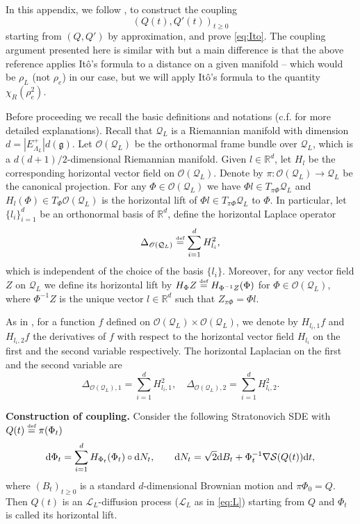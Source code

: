 \documentclass[11pt,UTF-8,reqno]{amsart}
\numberwithin{equation}{section}
\def\dif{{\mathord{{\rm d}}}}
\newcommand{\eqdef}{\stackrel{\mbox{\tiny def}}{=}}
\def\cL{{\mathcal L}}
\def\cQ{{\mathcal Q}}
\def\cS{{\mathcal S}}
\def\mR{{\mathbb R}}
\def\sO{{\mathscr O}}
\def\geq{\geqslant}
\def\ge{\geqslant}
\def\dif{{\mathord{{\rm d}}}}
\def\mfg{\mathfrak{g}}
\def\geq{\geqslant}
\def\ge{\geqslant}
\def\dg{d(\mfg)}
\begin{document}
In this appendix, we follow \cite{Ken86}, \cite[Section~2.1]{Wang}  to construct the coupling 
$$
(Q(t),Q'(t))_{t\geq0}
$$ 
starting from $(Q, Q')$ by approximation,
 and prove \eqref{eq:Ito}.
The coupling argument presented here is similar with  \cite[Chapter~2]{Wang} but a main difference is that  the above reference applies It\^o's formula to a distance on a given manifold -- which would be $\rho_L$ (not $\rho_e$) in our case, but we will
apply It\^o's formula to the quantity $\chi_R(\rho_e^2)$.


Before proceeding we recall the basic definitions and notations (c.f. \cite[Chapter~2]{Hsu} for more detailed explanations).
Recall that  $\cQ_L$ is a Riemannian manifold with dimension $d=|E^+_{\Lambda_L}|\dg$.
Let $\sO(\cQ_L)$ be the orthonormal frame bundle over $\cQ_L$, which is  a $d(d+1)/2$-dimensional Riemannian manifold.
Given $l\in \mR^d$, let $H_l$ be the corresponding horizontal vector field on $\sO(\cQ_L)$.
Denote by $\pi: \sO(\cQ_L) \rightarrow \cQ_L$ be the canonical projection.
For any $\Phi\in \sO(\cQ_L)$ we have $\Phi l\in T_{\pi \Phi}\cQ_L$ and $H_l(\Phi)\in T_{\Phi}\sO(\cQ_L)$ is the horizontal lift of $\Phi l\in T_{\pi \Phi}\cQ_L$ to $\Phi$.
In particular, let $\{l_i\}_{i=1}^d$ be an orthonormal basis of $\mR^d$, define the horizontal Laplace operator
$$\Delta_{\sO(\cQ_L)}\eqdef \sum_{i=1}^dH^2_{l_i},$$
which is independent of the choice of the basis $\{l_i\}$.
Moreover, for any vector field $Z$ on $\cQ_L$ we define its horizontal lift by
$H_{\Phi}Z\eqdef H_{\Phi^{-1}Z}(\Phi)$ for $\Phi\in \sO(\cQ_L)$, where $\Phi^{-1}Z$ is the unique vector $l\in \mR^d$ such that $Z_{\pi \Phi}=\Phi l$.

As in \cite[Chapter~6]{Hsu}, for a function $f$ defined on $\sO(\cQ_L)\times \sO(\cQ_L)$,
we denote by $H_{l_i,1}f$ and $H_{l_i,2}f$  the derivatives of $f$ with respect to the horizontal vector field $H_{l_i}$ on the first and the second variable respectively. The horizontal Laplacian on the first and the second variable are
$$\Delta_{\sO(\cQ_L),1}=\sum_{i=1}^dH_{l_i,1}^2,\quad \Delta_{\sO(\cQ_L),2}=\sum_{i=1}^dH_{l_i,2}^2.$$



{\bf Construction of coupling.}
Consider the following Stratonovich SDE with $Q(t)\eqdef \pi(\Phi_t)$
\begin{equation}\label{eq2.1}
	\dif \Phi_t=\sum_{i=1}^d H_{\Phi_t}(\Phi_t)\circ \dif N_t,\qquad
	\dif N_t=\sqrt2\dif B_t+\Phi_t^{-1}\nabla \cS(Q(t))\dif t,
\end{equation}
where  $(B_t)_{t\ge 0}$ is a standard
$d$-dimensional Brownian motion and $\pi \Phi_0=Q$. Then $Q(t)$ is an $\cL_L$-diffusion process ($\cL_L$ as in \eqref{eq:L})
 starting from $Q$ and $\Phi_t$ is called its horizontal lift.
\end{document}
